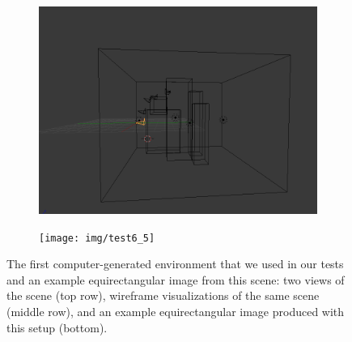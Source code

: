 \begin{figure}
\begin{subfigure}{0.4\textwidth}
		\includegraphics[width=\textwidth]{img/test6_4}
	\end{subfigure}
	\begin{subfigure}{0.8\textwidth}
		\centering
		\texttt{[image: img/test6\_5]}
	\end{subfigure}
	\caption{The first computer-generated environment that we used in our tests and
	an example equirectangular image from this scene: two views of the scene (top row),
	wireframe visualizations of the same scene (middle row), and an example
	equirectangular image produced with this setup (bottom).}
    \label{fig:test6}
\end{figure}
%

